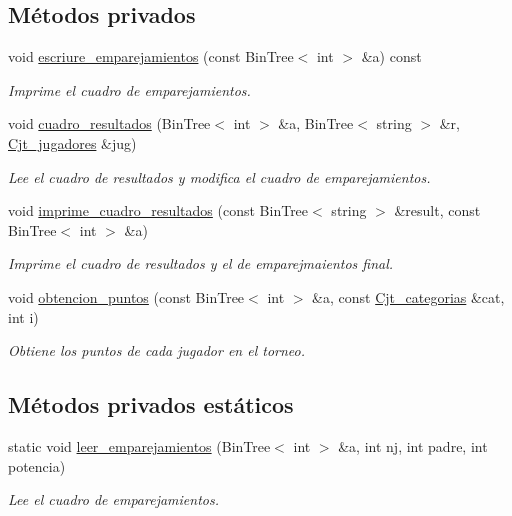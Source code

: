 \subsection*{Métodos privados}
\begin{DoxyCompactItemize}
\item 
void \hyperlink{class_torneo_ada7981ac531bf186fa6df689620574cc}{escriure\+\_\+emparejamientos} (const Bin\+Tree$<$ int $>$ \&a) const
\begin{DoxyCompactList}\small\item\em Imprime el cuadro de emparejamientos. \end{DoxyCompactList}\item 
void \hyperlink{class_torneo_a64eda02f7720674f1808521d5547c02a}{cuadro\+\_\+resultados} (Bin\+Tree$<$ int $>$ \&a, Bin\+Tree$<$ string $>$ \&r, \hyperlink{class_cjt__jugadores}{Cjt\+\_\+jugadores} \&jug)
\begin{DoxyCompactList}\small\item\em Lee el cuadro de resultados y modifica el cuadro de emparejamientos. \end{DoxyCompactList}\item 
void \hyperlink{class_torneo_aa42b2460bffdc5e1e85f7ebff4a5a6d0}{imprime\+\_\+cuadro\+\_\+resultados} (const Bin\+Tree$<$ string $>$ \&result, const Bin\+Tree$<$ int $>$ \&a)
\begin{DoxyCompactList}\small\item\em Imprime el cuadro de resultados y el de emparejmaientos final. \end{DoxyCompactList}\item 
void \hyperlink{class_torneo_a5ee0c8ca296bf422d040b05c768f7ba0}{obtencion\+\_\+puntos} (const Bin\+Tree$<$ int $>$ \&a, const \hyperlink{class_cjt__categorias}{Cjt\+\_\+categorias} \&cat, int i)
\begin{DoxyCompactList}\small\item\em Obtiene los puntos de cada jugador en el torneo. \end{DoxyCompactList}\end{DoxyCompactItemize}
\subsection*{Métodos privados estáticos}
\begin{DoxyCompactItemize}
\item 
static void \hyperlink{class_torneo_ae4d0e16d82621a4f5e16fcec74ccdcba}{leer\+\_\+emparejamientos} (Bin\+Tree$<$ int $>$ \&a, int nj, int padre, int potencia)
\begin{DoxyCompactList}\small\item\em Lee el cuadro de emparejamientos. \end{DoxyCompactList}\end{DoxyCompactItemize}
